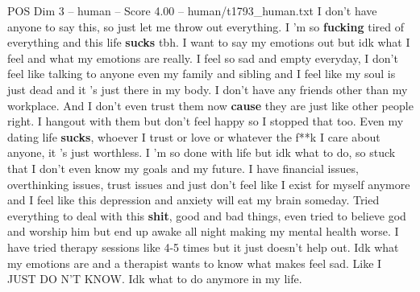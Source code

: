 \begin{textsample}{POS Dim 3 – human – Score 4.00 – human/t1793\_human.txt}  \label{ex:f3_pos_004}
I don't have anyone to say this, so just let me throw out everything.
I 'm so \textbf{fucking} tired of everything and this life \textbf{sucks} tbh.
I want to say my emotions out but idk what I feel and what my emotions are really.
I feel so sad and empty everyday, I don't feel like talking to anyone even my family and sibling and I feel like my soul is just dead and it 's just there in my body.
I don't have any friends other than my workplace.
And I don't even trust them now \textbf{cause} they are just like other people right.
I hangout with them but don't feel happy so I stopped that too.
Even my dating life \textbf{sucks}, whoever I trust or love or whatever the f**k I care about anyone, it 's just worthless.
I 'm so done with life but idk what to do, so stuck that I don't even know my goals and my future.
I have financial issues, overthinking issues, trust issues and just don't feel like I exist for myself anymore and I feel like this depression and anxiety will eat my brain someday.
Tried everything to deal with this \textbf{shit}, good and bad things, even tried to believe god and worship him but end up awake all night making my mental health worse.
I have tried therapy sessions like 4-5 times but it just doesn't help out.
Idk what my emotions are and a therapist wants to know what makes feel sad.
Like I JUST DO N'T KNOW.
Idk what to do anymore in my life.

\end{textsample}

